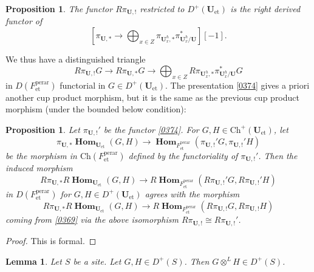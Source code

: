 \documentclass{amsart}
\newtheorem{Prop}[Thm]{Proposition}
\newtheorem{Lem}[Thm]{Lemma}
\theoremstyle{remark}
\numberwithin{equation}{subsection}
\newcommand{\tensor}{\mathbin{\otimes}}
\newcommand{\et}{\mathrm{et}}
\newcommand{\perar}{\mathrm{perar}}
\newcommand{\alg}[1]{\mathbf{#1}}
\newcommand{\Ch}{\mathrm{Ch}}
\DeclareMathOperator{\sheafhom}{\alg{Hom}}
\begin{document}
\begin{Prop} \label{0378}
	The functor $R \pi_{\alg{U}, !}$ restricted to $D^{+}(\alg{U}_{\et})$ is
	the right derived functor of
		\begin{equation} \label{0374}
			\left[
					\pi_{\alg{U}, \ast}
				\to
					\bigoplus_{x \in Z}
						\pi_{\alg{U}_{x}^{h}, \ast}
						\pi_{\alg{U}_{x}^{h} / \alg{U}}^{\ast}
			\right][-1].
		\end{equation}
\end{Prop}

We thus have a distinguished triangle
	\begin{equation} \label{0380}
			R \pi_{\alg{U}, !} G
		\to
			R \pi_{\alg{U}, \ast} G
		\to
			\bigoplus_{x \in Z}
				R \pi_{\alg{U}_{x}^{h}, \ast}
				\pi_{\alg{U}_{x}^{h} / \alg{U}}^{\ast} G
	\end{equation}
in $D(F^{\perar}_{\et})$ functorial in $G \in D^{+}(\alg{U}_{\et})$.
The presentation \eqref{0374} gives a priori another cup product morphism,
but it is the same as the previous cup product morphism
(under the bounded below condition):

\begin{Prop} \label{0376}
	Let $\pi_{\alg{U}, !}'$ be the functor \eqref{0374}.
	For $G, H \in \Ch^{+}(\alg{U}_{\et})$, let
		\[
				\pi_{\alg{U}, \ast}
				\sheafhom_{\alg{U}_{\et}}(G, H)
			\to
				\sheafhom_{F^{\perar}_{\et}}(\pi_{\alg{U}, !}' G, \pi_{\alg{U}, !}' H)
		\]
	be the morphism in $\Ch(F^{\perar}_{\et})$
	defined by the functoriality of $\pi_{\alg{U}, !}'$.
	Then the induced morphism
		\begin{equation} \label{0375}
				R \pi_{\alg{U}, \ast}
				R \sheafhom_{\alg{U}_{\et}}(G, H)
			\to
				R \sheafhom_{F^{\perar}_{\et}}(R \pi_{\alg{U}, !}' G, R \pi_{\alg{U}, !}' H)
		\end{equation}
	in $D(F^{\perar}_{\et})$ for $G, H \in D^{+}(\alg{U}_{\et})$
	agrees with the morphism
		\[
				R \pi_{\alg{U}, \ast}
				R \sheafhom_{\alg{U}_{\et}}(G, H)
			\to
				R \sheafhom_{F^{\perar}_{\et}}(R \pi_{\alg{U}, !} G, R \pi_{\alg{U}, !} H)
		\]
	coming from \eqref{0369} via the above isomorphism
	$R \pi_{\alg{U}, !} \cong R \pi_{\alg{U}, !}'$.
\end{Prop}

\begin{proof}
	This is formal.
\end{proof}

\begin{Lem} \label{0136}
	Let $S$ be a site.
	Let $G, H \in D^{+}(S)$.
	Then $G \tensor^{L} H \in D^{+}(S)$.
\end{Lem}
\end{document}
